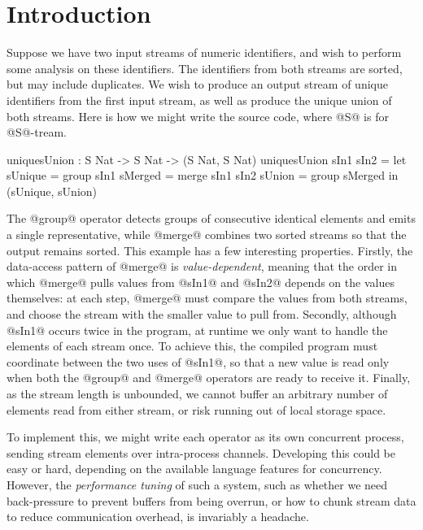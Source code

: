 \section{Introduction}
\label{s:Introduction}

Suppose we have two input streams of numeric identifiers, and wish to perform some analysis on these identifiers. The identifiers from both streams are sorted, but may include duplicates. We wish to produce an output stream of unique identifiers from the first input stream, as well as produce the unique union of both streams. Here is how we might write the source code, where @S@ is for @S@-tream.
\begin{code}
  uniquesUnion : S Nat -> S Nat -> (S Nat, S Nat)
  uniquesUnion sIn1 sIn2
   = let  sUnique = group sIn1
          sMerged = merge sIn1 sIn2
          sUnion  = group sMerged
     in   (sUnique, sUnion)
\end{code}

The @group@ operator detects groups of consecutive identical elements and emits a single representative, while @merge@ combines two sorted streams so that the output remains sorted. This example has a few interesting properties. Firstly, the data-access pattern of @merge@ is \emph{value-dependent}, meaning that the order in which @merge@ pulls values from @sIn1@ and @sIn2@ depends on the values themselves: at each step, @merge@ must compare the values from both streams, and choose the stream with the smaller value to pull from.
Secondly, although @sIn1@ occurs twice in the program, at runtime we only want to handle the elements of each stream once. To achieve this, the compiled program must coordinate between the two uses of @sIn1@, so that a new value is read only when both the @group@ and @merge@ operators are ready to receive it. Finally, as the stream length is unbounded, we cannot buffer an arbitrary number of elements read from either stream, or risk running out of local storage space.

To implement this, we might write each operator as its own concurrent process, sending stream elements over intra-process channels. Developing this could be easy or hard, depending on the available language features for concurrency. However, the \emph{performance tuning} of such a system, such as whether we need back-pressure to prevent buffers from being overrun, or how to chunk stream data to reduce communication overhead, is invariably a headache. 

